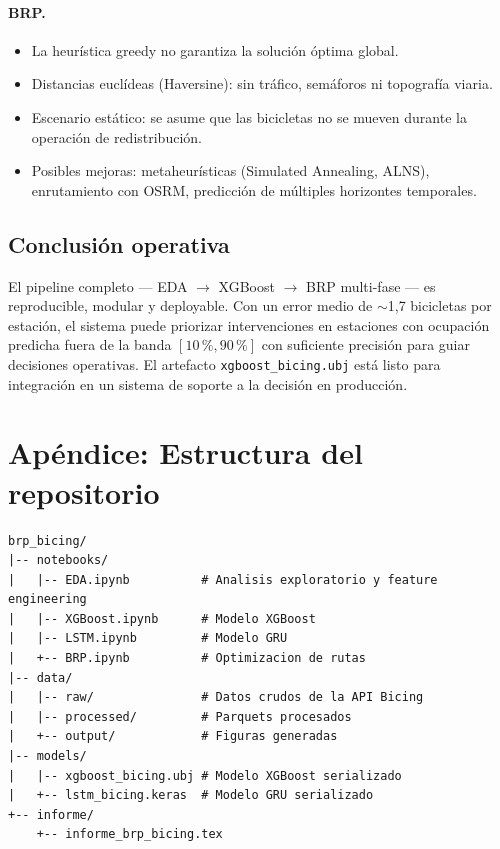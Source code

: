 \documentclass[12pt,a4paper]{article}
\begin{document}
\paragraph{BRP.}
\begin{itemize}
  \item La heurística greedy no garantiza la solución óptima global.
  \item Distancias euclídeas (Haversine): sin tráfico, semáforos ni topografía viaria.
  \item Escenario estático: se asume que las bicicletas no se mueven durante la
        operación de redistribución.
  \item Posibles mejoras: metaheurísticas (Simulated Annealing, ALNS), enrutamiento
        con OSRM, predicción de múltiples horizontes temporales.
\end{itemize}

\subsection{Conclusión operativa}

El pipeline completo --- EDA $\to$ XGBoost $\to$ BRP multi-fase --- es reproducible,
modular y deployable. Con un error medio de $\sim$1,7 bicicletas por estación, el
sistema puede priorizar intervenciones en estaciones con ocupación predicha fuera
de la banda $[10\,\%, 90\,\%]$ con suficiente precisión para guiar decisiones
operativas. El artefacto \texttt{xgboost\_bicing.ubj} está listo para integración
en un sistema de soporte a la decisión en producción.

\appendix
\section{Apéndice: Estructura del repositorio}

\begin{lstlisting}
brp_bicing/
|-- notebooks/
|   |-- EDA.ipynb          # Analisis exploratorio y feature engineering
|   |-- XGBoost.ipynb      # Modelo XGBoost
|   |-- LSTM.ipynb         # Modelo GRU
|   +-- BRP.ipynb          # Optimizacion de rutas
|-- data/
|   |-- raw/               # Datos crudos de la API Bicing
|   |-- processed/         # Parquets procesados
|   +-- output/            # Figuras generadas
|-- models/
|   |-- xgboost_bicing.ubj # Modelo XGBoost serializado
|   +-- lstm_bicing.keras  # Modelo GRU serializado
+-- informe/
    +-- informe_brp_bicing.tex
\end{lstlisting}
\end{document}
